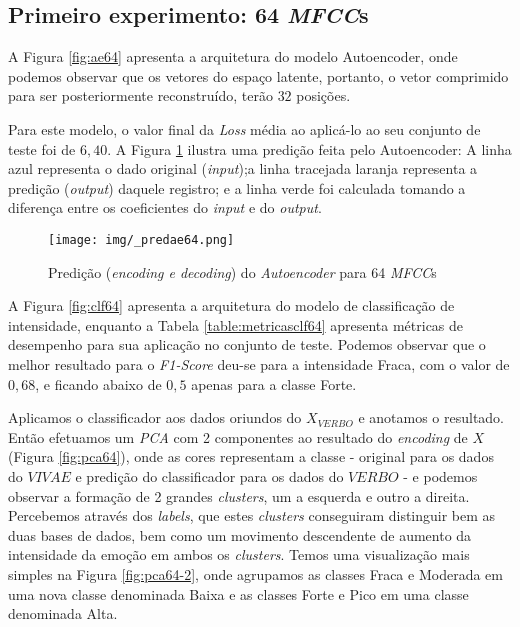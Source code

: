 \subsection{Primeiro experimento: 64 \textit{MFCC}s}

A Figura \ref{fig:ae64} apresenta a arquitetura do modelo Autoencoder, onde podemos observar que os vetores do espaço latente, portanto, o vetor comprimido para ser posteriormente reconstruído, terão $32$ posições.

Para este modelo, o valor final da \textit{Loss} média ao aplicá-lo ao seu conjunto de teste foi de $6,40$. A Figura \ref{fig:predae64} ilustra uma predição feita pelo Autoencoder: A linha azul representa o dado original (\textit{input});a linha tracejada laranja representa a predição (\textit{output}) daquele registro; e a linha verde foi calculada tomando a diferença entre os coeficientes do \textit{input} e do \textit{output}.

\begin{figure}[h]
    \centering
    \texttt{[image: img/\_predae64.png]}
    \caption{\label{fig:predae64}Predição (\textit{encoding e decoding}) do \textit{Autoencoder} para 64 \textit{MFCC}s}
\end{figure}

A Figura \ref{fig:clf64} apresenta a arquitetura do modelo de classificação de intensidade, enquanto a Tabela \ref{table:metricasclf64} apresenta métricas de desempenho para sua aplicação no conjunto de teste. Podemos observar que o melhor resultado para o \textit{F1-Score} deu-se para a intensidade Fraca, com o valor de $0,68$, e ficando abaixo de $0,5$ apenas para a classe Forte.

Aplicamos o classificador aos dados oriundos do $X_{VERBO}$ e anotamos o resultado. Então efetuamos um \textit{PCA} com 2 componentes ao resultado do \textit{encoding} de $X$ (Figura \ref{fig:pca64}), onde as cores representam a classe - original para os dados do $VIVAE$ e predição do classificador para os dados do $VERBO$ - e podemos observar a formação de 2 grandes \textit{clusters}, um a esquerda e outro a direita. Percebemos através dos \textit{labels}, que estes \textit{clusters} conseguiram distinguir bem as duas bases de dados, bem como um movimento descendente de aumento da intensidade da emoção em ambos os \textit{clusters}. Temos uma visualização mais simples na Figura \ref{fig:pca64-2}, onde agrupamos as classes Fraca e Moderada em uma nova classe denominada Baixa e as classes Forte e Pico em uma classe denominada Alta.

